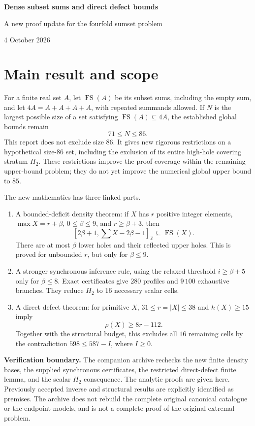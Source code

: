 \documentclass[11pt,a4paper]{article}
\newcommand{\FS}{\operatorname{FS}}
\newcommand{\Z}{\mathbb Z}
\newcommand{\ints}[2]{[#1,#2]_{\Z}}
\begin{document}
\thispagestyle{plain}
{\LARGE\bfseries Dense subset sums and direct defect bounds\par}
\vspace{.5em}
{\large A new proof update for the fourfold sumset problem\par}
{4 October 2026\par}
\section*{Main result and scope}
For a finite real set $A$, let $\FS(A)$ be its subset sums, including the empty sum, and let $4A=A+A+A+A$, with repeated summands allowed. If $N$ is the largest possible size of a set satisfying $\FS(A)\subseteq4A$, the established global bounds remain
\[
\boxed{71\le N\le86}.
\]
This report does not exclude size $86$. It gives new rigorous restrictions on a hypothetical size-$86$ set, including the exclusion of its entire high-hole covering stratum $H_2$. These restrictions improve the proof coverage within the remaining upper-bound problem; they do not yet improve the numerical global upper bound to $85$.

The new mathematics has three linked parts.
\begin{enumerate}
\item A bounded-deficit density theorem: if $X$ has $r$ positive integer elements, $\max X=r+\beta$, $0\le\beta\le9$, and $r\ge\beta+3$, then
\[
\ints{2\beta+1}{\sum X-2\beta-1}\subseteq\FS(X).
\]
There are at most $\beta$ lower holes and their reflected upper holes. This is proved for unbounded $r$, but only for $\beta\le9$.
\item A stronger synchronous inference rule, using the relaxed threshold $i\ge\beta+5$ only for $\beta\le8$. Exact certificates give $280$ profiles and $9\,100$ exhaustive branches. They reduce $H_2$ to $16$ necessary scalar cells.
\item A direct defect theorem: for primitive $X$, $31\le r=|X|\le38$ and $h(X)\ge15$ imply
\[
\rho(X)\ge8r-112.
\]
Together with the structural budget, this excludes all $16$ remaining cells by the contradiction $598\le587-I$, where $I\ge0$.
\end{enumerate}
\textbf{Verification boundary.} The companion archive rechecks the new finite density bases, the supplied synchronous certificates, the restricted direct-defect finite lemma, and the scalar $H_2$ consequence. The analytic proofs are given here. Previously accepted inverse and structural results are explicitly identified as premises. The archive does not rebuild the complete original canonical catalogue or the endpoint models, and is not a complete proof of the original extremal problem.
\end{document}
